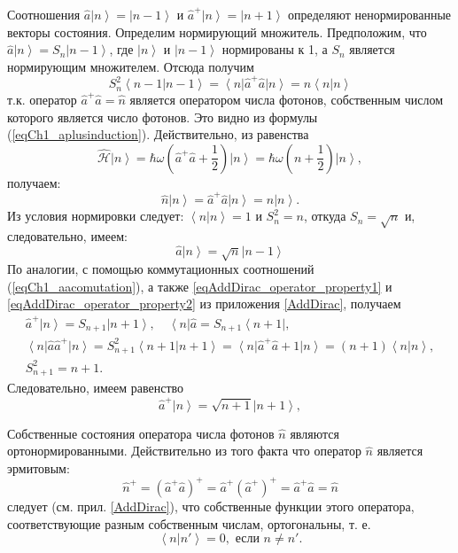 Соотношения 
$\hat{a} \left|n\right> = \left|n - 1\right>$
и
$\hat{a}^{+} \left|n\right> = \left|n + 1\right>$
определяют ненормированные векторы состояния. Определим нормирующий
множитель. Предположим, что  
$\hat{a} \left|n\right> = S_n \left|n - 1\right>$,  где 
$\left|n\right>$ и $\left|n - 1\right>$ нормированы к  1,  а $S_n$
является нормирующим множителем. Отсюда получим 
\[
S_n^2\left<n - 1\right.\left|n - 1\right> =
\left<n\right|\hat{a}^{+}\hat{a}\left|n\right> = 
n  \left<n\right.\left|n\right>
\]
т.к. оператор    
$\hat{a}^{+}\hat{a} = \hat{n}$
является оператором числа фотонов, собственным числом
которого является число фотонов. Это видно из формулы
(\ref{eqCh1_aplusinduction}). Действительно, из равенства
\[
\hat{\mathcal{H}} \left|n\right> =
\hbar \omega \left(
\hat{a}^{+}\hat{a} + \frac{1}{2}
\right)
\left|n\right> = 
\hbar \omega \left(n + \frac{1}{2}\right)
\left|n\right>,
\]
получаем:
\[
\hat{n}\left|n\right> = \hat{a}^{+}\hat{a} \left|n\right> = n
\left|n\right>. 
\]
Из условия нормировки следует: $\left<n\right.\left|n\right> = 1$   и
$S_n^2 = n$,  откуда $S_n = \sqrt{n}$ и, следовательно, имеем: 
\begin{equation}
\hat{a}\left|n\right> = \sqrt{n}\left|n - 1\right>
\end{equation}
По аналогии, с помощью коммутационных соотношений
(\ref{eqCh1_aacomutation}), а также \ref{eqAddDirac_operator_property1} и
  \ref{eqAddDirac_operator_property2} из приложения \ref{AddDirac},
  получаем 
\begin{eqnarray}
\hat{a}^{+}\left|n\right> = S_{n+1}\left|n + 1\right>,
\quad 
\left<n\right|\hat{a} = S_{n + 1}\left<n + 1\right|,
\nonumber \\
\left<n\right|\hat{a}\hat{a}^{+}\left|n\right> = S_{n+1}^2
\left<n + 1\right|\left.n + 1\right> = 
\left<n\right|\hat{a}^{+}\hat{a} + 1\left|n\right> = 
\left(n + 1\right)\left<n\right.\left|n\right>,
\nonumber \\
S_{n+1}^2 = n + 1.
\end{eqnarray}
Следовательно, имеем равенство
\begin{equation}
\hat{a}^{+}\left|n\right> = \sqrt{n + 1}\left|n + 1\right>,
\end{equation}

Собственные состояния оператора числа фотонов $\hat{n}$ являются ортонормированными. 
Действительно из того факта что оператор $\hat{n}$ является эрмитовым:
\[
\hat{n}^{+} = \left(\hat{a}^{+}\hat{a}\right)^{+} = 
\hat{a}^{+} \left(\hat{a}^{+}\right)^{+} = 
\hat{a}^{+}\hat{a} = \hat{n}
\]
следует (см. прил. \ref{AddDirac}), что собственные функции этого оператора,
соответствующие разным собственным числам, ортогональны, т. е.
\begin{equation}
\left<n\right|\left.n'\right> = 0, \mbox{ если } n \ne n'.
\label{eqOrtoN}
\end{equation}

